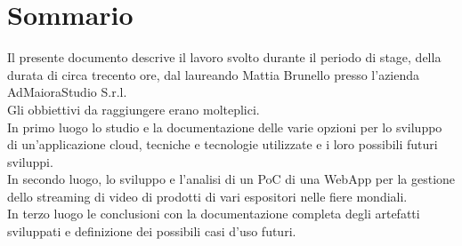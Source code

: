 \cleardoublepage
{}
{}
\begingroup
\let\clearpage\relax
\let\cleardoublepage\relax
\let\cleardoublepage\relax

\chapter*{Sommario}

Il presente documento descrive il lavoro svolto durante il periodo di stage, della durata di circa trecento ore, dal laureando Mattia Brunello presso l'azienda AdMaioraStudio S.r.l.\\
Gli obbiettivi da raggiungere erano molteplici.\\
In primo luogo lo studio e la documentazione delle varie opzioni per lo sviluppo di un'applicazione cloud, tecniche e tecnologie utilizzate e i loro possibili futuri sviluppi.\\
In secondo luogo, lo sviluppo e l'analisi di un PoC di una WebApp per la gestione dello streaming di video di prodotti di vari espositori nelle fiere mondiali.\\
In terzo luogo le conclusioni con la documentazione completa degli artefatti sviluppati e definizione dei possibili casi d'uso futuri.\\




\endgroup

\vfill

